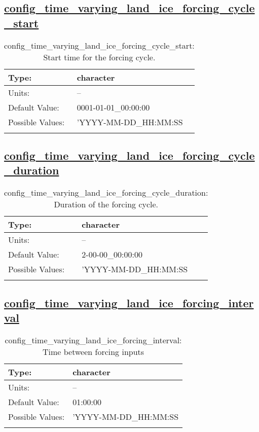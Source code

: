 \subsection[config\_time\_varying\_land\_ice\_forcing\_cycle\_start]{\hyperref[sec:nm_tab_time_varying_forcing]{config\_time\_varying\_land\_ice\_forcing\_cycle\_start}}
\label{subsec:nm_sec_config_time_varying_land_ice_forcing_cycle_start}
\begin{center}
\begin{longtable}{| p{2.0in} || p{4.0in} |}
    \hline
    Type: & character \\
    \hline
    Units: & -- \\
    \hline
    Default Value: & 0001-01-01\_00:00:00 \\
    \hline
    Possible Values: & 'YYYY-MM-DD\_HH:MM:SS \\
    \hline
    \caption{config\_time\_varying\_land\_ice\_forcing\_cycle\_start: Start time for the forcing cycle.}
\end{longtable}
\end{center}
\subsection[config\_time\_varying\_land\_ice\_forcing\_cycle\_duration]{\hyperref[sec:nm_tab_time_varying_forcing]{config\_time\_varying\_land\_ice\_forcing\_cycle\_duration}}
\label{subsec:nm_sec_config_time_varying_land_ice_forcing_cycle_duration}
\begin{center}
\begin{longtable}{| p{2.0in} || p{4.0in} |}
    \hline
    Type: & character \\
    \hline
    Units: & -- \\
    \hline
    Default Value: & 2-00-00\_00:00:00 \\
    \hline
    Possible Values: & 'YYYY-MM-DD\_HH:MM:SS \\
    \hline
    \caption{config\_time\_varying\_land\_ice\_forcing\_cycle\_duration: Duration of the forcing cycle.}
\end{longtable}
\end{center}
\subsection[config\_time\_varying\_land\_ice\_forcing\_interval]{\hyperref[sec:nm_tab_time_varying_forcing]{config\_time\_varying\_land\_ice\_forcing\_interval}}
\label{subsec:nm_sec_config_time_varying_land_ice_forcing_interval}
\begin{center}
\begin{longtable}{| p{2.0in} || p{4.0in} |}
    \hline
    Type: & character \\
    \hline
    Units: & -- \\
    \hline
    Default Value: & 01:00:00 \\
    \hline
    Possible Values: & 'YYYY-MM-DD\_HH:MM:SS \\
    \hline
    \caption{config\_time\_varying\_land\_ice\_forcing\_interval: Time between forcing inputs}
\end{longtable}
\end{center}
